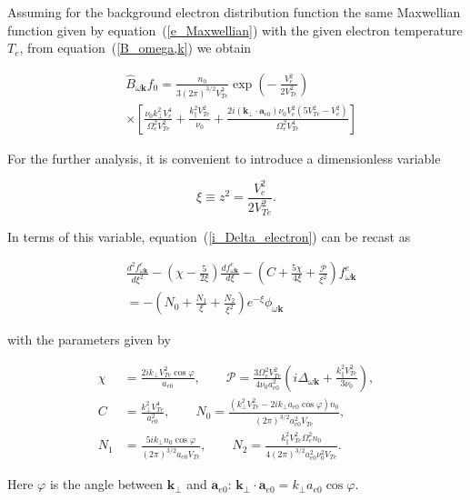 \documentclass[draft]{agujournal2019}
\renewcommand{\vec}{\mathbf}
\begin{document}
Assuming for the background electron distribution function the same Maxwellian
function given by equation~(\ref{e_Maxwellian}) with the given electron temperature $T_{e}$,
from equation~(\ref{B_omega,k}) we obtain
\begin{linenomath*}
\begin{align}
& \hat{B}_{\omega\vec{k}}f_{0}=\frac{n_{0}}{3\left(  2\pi\right)  ^{3/2}%
V_{Te}^{3}}\exp\left(  -\ \frac{V_{e}^{2}}{2V_{Te}^{2}}\right)  \nonumber\\
& \times\left[  \frac{\nu_{0}k_{\perp}^{2}V_{e}^{4}}{\Omega_{e}^{2}V_{Te}^{2}%
}+\frac{k_{\|}^{2}V_{Te}^{2}}{\nu_{0}}+\frac{2i\left(  \vec{k}_{\perp
}\cdot\vec{a}_{e0}\right)  \nu_{0}V_{e}^{2}\left(  5V_{Te}^{2}-V_{e}^{2}\right)}{\Omega_{e}^{2}V_{Te}^{4}}\right]  
\label{Bf_0}
\end{align}
\end{linenomath*}
For the further analysis, it is convenient to introduce a dimensionless variable
\begin{linenomath*}
\begin{equation}
\xi\equiv z^2=\frac{V_{e}^{2}}{2V_{Te}^{2}}. 
\label{xi}
\end{equation}
\end{linenomath*}
In terms of this variable, equation~(\ref{i_Delta_electron}) can be recast as
\begin{linenomath*}
\begin{align}
&  \frac{d^{2}f_{\omega\vec{k}}^{e}}{d\xi^{2}}-\left(  \chi-\frac{5}{2\xi
}\right)  \frac{df_{\omega\vec{k}}^{e}}{d\xi}-\left(  C+\frac{5\chi}{4\xi
}+\frac{\mathcal{P}}{\xi^{2}}\right)  f_{\omega\vec{k}}^{e}\nonumber\\
&  =-\left(  N_{0}+\frac{N_{1}}{\xi}+\frac{N_{2}}{\xi^{2}}\right)  e^{-\xi
}\phi_{\omega\vec{k}} 
\label{full_equation_xi_new_1}
\end{align}
\end{linenomath*}
with the parameters given by
\begin{linenomath*}
\begin{align}
\chi &  =\frac{2ik_{\perp}V_{Te}^{2}\cos\varphi}{a_{e0}},\qquad\mathcal{P}%
=\frac{3\Omega_{e}^{2}V_{Te}^{2}}{4\nu_{0}a_{e0}^{2}}\left(  i\Delta
_{\omega\vec{k}}+\frac{k_{\|}^{2}V_{Te}^{2}}{3\nu_{0}}\right)
,\nonumber\\
C  &  =\frac{k_{\perp}^{2}V_{Te}^{4}}{a_{e0}^{2}},\qquad N_{0}=\frac{\left(
k_{\perp}^{2}V_{Te}^{2}-2ik_{\perp}a_{e0}\cos\varphi\right)  n_{0}}{\left(
2\pi\right)  ^{3/2}a_{e0}^{2}V_{Te}},\nonumber\\
N_{1}  &  =\frac{5ik_{\perp}n_{0}\cos\varphi}{\left(  2\pi\right)
^{3/2}a_{e0}V_{Te}},\qquad N_{2}=\frac{k_{\|}^{2}V_{Te}^{2}\Omega
_{e}^{2}n_{0}}{4\left(  2\pi\right)  ^{3/2}a_{e0}^{2}\nu_{0}^{2}V_{Te}}.
\label{pPCxiABD_1}
\end{align}
\end{linenomath*}
Here $\varphi$ is the angle between $\vec{k}_{\perp}$ and 
$\vec{a}_{e0}$: $\vec{k}_{\perp}\cdot\vec{a}_{e0}=k_{\perp}a_{e0}\cos\varphi$.
\end{document}
